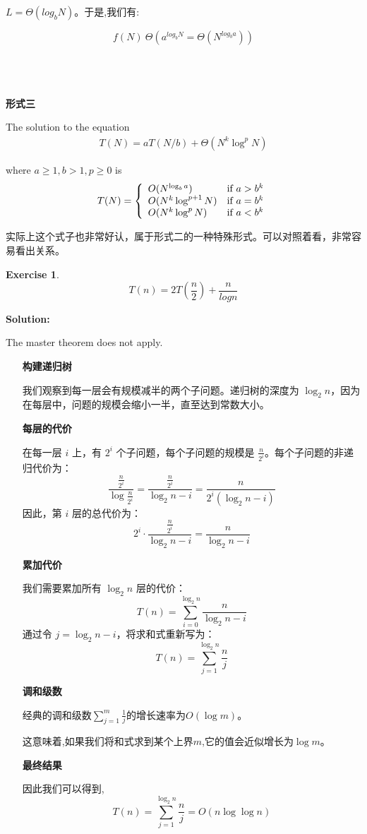 \documentclass{article}
\newtheorem*{Exercise}{Exercise}
\begin{document}
$L = \Theta(log_b N)$。于是,我们有:\par
$$f(N)~\Theta(a^{log_b N} = \Theta(N^{log_b a}))$$
\\\hspace*{\fill}\\\hspace*{\fill}\\\hspace*{\fill}\par
\textbf{形式三}\par
The solution to the equation 
\begin{align*}
    T(N)=aT(N/b)+\Theta(N^k\log^p N)
\end{align*}\par
where $a\ge 1, b>1, p\ge 0$ is
\begin{align*}
    T(N)=\left\{ \begin{array}[c]{ll}
        O(N^{\log_b a}) & \text{if }a>b^k \\
        O(N^k\log^{p+1}N)&\text{if }a=b^k\\
        O(N^k\log^p N)&\text{if }a<b^k
    \end{array} \right.
\end{align*}\par
实际上这个式子也非常好认，属于形式二的一种特殊形式。可以对照着看，非常容易看出关系。

\begin{Exercise}
    $$T(n) = 2T (\frac{n}{2}) + \frac{n}{log n}$$
\end{Exercise}
\textbf{Solution:}\par
The master theorem does not apply.
\begin{enumerate}
    \item [\textbf{构建递归树}]\par
    我们观察到每一层会有规模减半的两个子问题。递归树的深度为 \(\log_2 n\)，因为在每层中，问题的规模会缩小一半，直至达到常数大小。
    \item [\textbf{每层的代价}]\par
    在每一层 \(i\) 上，有 \(2^i\) 个子问题，每个子问题的规模是 \(\frac{n}{2^i}\)。每个子问题的非递归代价为：
    $$\frac{\frac{n}{2^i}}{\log \frac{n}{2^i}} = \frac{\frac{n}{2^i}}{\log_2 n - i} = \frac{n}{2^i (\log_2 n - i)}$$
    因此，第 \(i\) 层的总代价为：
    $$2^i \cdot \frac{\frac{n}{2^i}}{\log_2 n - i} = \frac{n}{\log_2 n - i}$$
    \item [\textbf{累加代价}]\par
    我们需要累加所有 \(\log_2 n\) 层的代价：
    $$T(n) = \sum_{i=0}^{\log_2 n} \frac{n}{\log_2 n - i}$$
    通过令 \(j = \log_2 n - i\)，将求和式重新写为：
    $$T(n) = \sum_{j=1}^{\log_2 n} \frac{n}{j}$$
    \item [\textbf{调和级数}]\par
    经典的调和级数$\sum\limits_{j=1}^{m}\frac{1}{j}$的增长速率为$O(\log m)$。\par
    这意味着,如果我们将和式求到某个上界$m$,它的值会近似增长为$\log m$。
    \item [\textbf{最终结果}]\par
    因此我们可以得到,$$T(n) = \sum_{j=1}^{\log_2 n} \frac{n}{j} = O(n \log \log n)$$
\end{enumerate}
\end{document}
